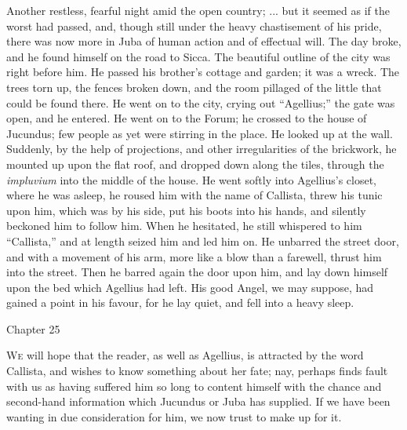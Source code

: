Another restless, fearful night amid the open country; ... but it
seemed as if the worst had passed, and, though still under the heavy
chastisement of his pride, there was now more in Juba of human action
and of effectual will. The day broke, and he found himself on the road
to Sicca. The beautiful outline of the city was right before him. He
passed his brother's cottage and garden; it was a wreck. The trees
torn up, the fences broken down, and the room pillaged of the little
that could be found there. He went on to the city, crying out ``Agellius;''
the gate was open, and he entered. He went on to the Forum; he crossed
to the house of Jucundus; few people as yet were stirring in the
place. He looked up at the wall. Suddenly, by the help of projections,
and other irregularities of the brickwork, he mounted up upon the flat
roof, and dropped down along the tiles, through the \emph{impluvium}
into the middle of the house. He went softly into Agellius's closet,
where he was asleep, he roused him with the name of Callista, threw
his tunic upon him, which was by his side, put his boots into his
hands, and silently beckoned him to follow him. When he hesitated, he
still whispered to him ``Callista,'' and at length seized him
and led him on. He unbarred the street door, and with a movement of
his arm, more like a blow than a farewell, thrust him into the street.
Then he barred again the door upon him, and lay down himself
upon the bed which Agellius had left. His good Angel, we may suppose,
had gained a point in his favour, for he lay quiet, and fell into a
heavy sleep.

Chapter 25


W\textsc{e} will hope that the reader, as well as Agellius, is
attracted by the word Callista, and wishes to know something about her
fate; nay, perhaps finds fault with us as having suffered him so long
to content himself with the chance and second-hand information which
Jucundus or Juba has supplied. If we have been wanting in due
consideration for him, we now trust to make up for it.


